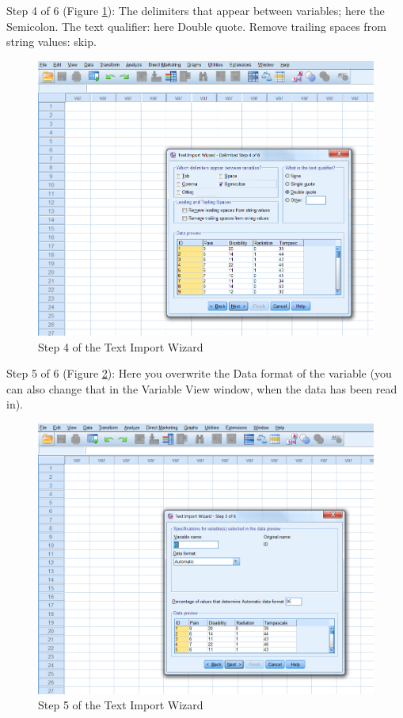 \documentclass[]{book}
\begin{document}
Step 4 of 6 (Figure \ref{fig:fig22}): The delimiters that appear between
variables; here the Semicolon. The text qualifier: here Double quote.
Remove trailing spaces from string values: skip.

\begin{figure}

{\centering \includegraphics[width=0.95\linewidth]{images/fig1.22} 

}

\caption{Step 4 of the Text Import Wizard}\label{fig:fig22}
\end{figure}

Step 5 of 6 (Figure \ref{fig:fig23}): Here you overwrite the Data format
of the variable (you can also change that in the Variable View window,
when the data has been read in).

\begin{figure}

{\centering \includegraphics[width=0.95\linewidth]{images/fig1.23} 

}

\caption{Step 5 of the Text Import Wizard}\label{fig:fig23}
\end{figure}
\end{document}
